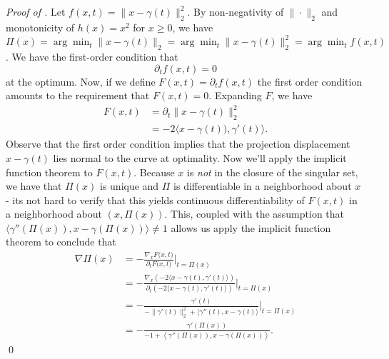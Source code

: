 \documentclass[11pt]{article}
\begin{document}
\noindent \textit{Proof of .} Let $f(x,t) = \|x - \gamma(t)\|_2^2$. By non-negativity of $\|\cdot\|_2$ and monotonicity of $h(x) = x^2$ for $x \geq 0$, we have $\Pi(x) = \arg\min_t \|x - \gamma(t)\|_2 = \arg \min_t \|x - \gamma(t)\|_2^2 = \arg\min_t f(x, t)$. We have the first-order condition that 
\[ \partial_t f(x,t) = 0\]
at the optimum. Now, if we define $F(x, t) = \partial_t f(x,t)$ the first order condition amounts to the requirement that $F(x,t) = 0$. Expanding $F$, we have
\begin{align}
    F(x, t) &= \partial_t \|x - \gamma(t)\|_2^2 \\ \label{eq: ift}
    &= -2\langle x - \gamma(t)), \gamma'(t)\rangle.
\end{align}
Observe that the first order condition implies that the projection displacement $x - \gamma(t)$ lies normal to the curve at optimality. 
Now we'll apply the implicit function theorem to $F(x, t)$. Because $x$ is \textit{not} in the closure of the singular set, we have that $\Pi(x)$ is unique and $\Pi$ is differentiable in a neighborhood about $x$ - its not hard to verify that this yields continuous differentiability of $F(x,t)$ in a neighborhood about $(x, \Pi(x))$. This, coupled with the assumption that $\langle\gamma''(\Pi(x)), x - \gamma(\Pi(x))\rangle \neq 1$ allows us apply the implicit function theorem to conclude that 
\begin{align}
    \nabla\Pi(x) &= - \frac{\nabla_x F\big(x, t\big)}{\partial_t F\big(x, t\big)} \Bigg|_{t = \Pi(x)}\\
    &= - \frac{\nabla_x\left(-2\langle x - \gamma(t), \gamma'(t)\rangle\right)}{\partial_t \left(-2\langle x - \gamma(t), \gamma'(t)\rangle\right)} \Bigg|_{t = \Pi(x)}\\
    &= -\frac{\gamma'(t)}{-\|\gamma'(t)\|_2^2 + 
    \langle\gamma''(t), x - \gamma(t)\rangle}\Bigg|_{t = \Pi(x)} \label{eq: projection grad} \\ 
    &= -\frac{\gamma'(\Pi(x))}{-1 + \left\langle\gamma''(\Pi(x)), x - \gamma(\Pi(x))\right\rangle}.
\end{align}
\qed{}
\end{document}
